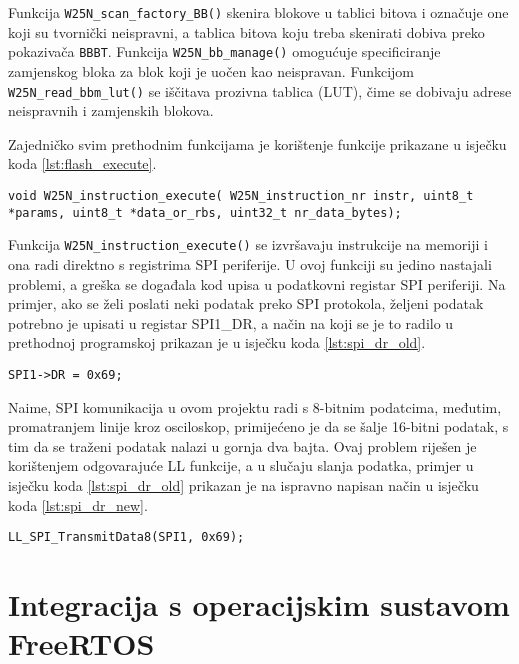 \noindent Funkcija \verb|W25N_scan_factory_BB()| skenira blokove u tablici bitova i označuje one koji su tvornički neispravni, a tablica bitova koju treba skenirati dobiva preko pokazivača \verb|BBBT|. Funkcija \verb|W25N_bb_manage()| omogućuje specificiranje zamjenskog bloka za blok koji je uočen kao neispravan. Funkcijom \verb|W25N_read_bbm_lut()| se iščitava prozivna tablica (LUT), čime se dobivaju adrese neispravnih i zamjenskih blokova.

Zajedničko svim prethodnim funkcijama je korištenje funkcije prikazane u isječku koda \ref{lst:flash_execute}.

\begin{lstlisting}[caption=Funkcija za izvođenje instrukcije na \textit{flash} memoriji, label={lst:flash_execute}]
void W25N_instruction_execute( W25N_instruction_nr instr, uint8_t *params, uint8_t *data_or_rbs, uint32_t nr_data_bytes);
\end{lstlisting}

\noindent Funkcija \verb|W25N_instruction_execute()| se izvršavaju instrukcije na  memoriji i ona radi direktno s registrima SPI periferije. U ovoj funkciji su jedino nastajali problemi, a greška se događala kod upisa u podatkovni registar SPI periferiji. Na primjer, ako se želi poslati neki podatak preko SPI protokola, željeni podatak potrebno je upisati u registar SPI1\_DR, a način na koji se je to radilo u prethodnoj programskoj prikazan je u isječku koda \ref{lst:spi_dr_old}.

\begin{lstlisting}[caption=Upis podatka u SPI2\_DR registar, label={lst:spi_dr_old}]
SPI1->DR = 0x69;
\end{lstlisting}

\noindent Naime, SPI komunikacija u ovom projektu radi s 8-bitnim podatcima, međutim, promatranjem linije kroz osciloskop, primijećeno je da se šalje 16-bitni podatak, s tim da se traženi podatak nalazi u gornja dva bajta. Ovaj problem riješen je korištenjem odgovarajuće LL funkcije, a u slučaju slanja podatka, primjer u isječku koda \ref{lst:spi_dr_old} prikazan je na ispravno napisan način u isječku koda \ref{lst:spi_dr_new}.

\begin{lstlisting}[caption=Ispravan upis podatka u SPI2\_DR registar, label={lst:spi_dr_new}]
LL_SPI_TransmitData8(SPI1, 0x69);
\end{lstlisting}

\section{Integracija s operacijskim sustavom FreeRTOS}

